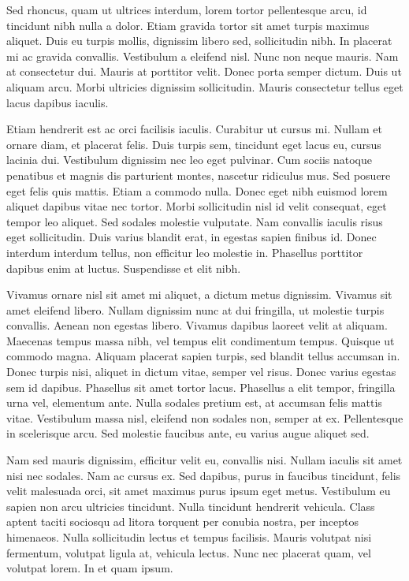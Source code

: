 Sed rhoncus, quam ut ultrices interdum, lorem tortor pellentesque arcu, id tincidunt
nibh nulla a dolor. Etiam gravida tortor sit amet turpis maximus aliquet. Duis eu turpis
mollis, dignissim libero sed, sollicitudin nibh. In placerat mi ac gravida convallis.
Vestibulum a eleifend nisl. Nunc non neque mauris. Nam at consectetur dui. Mauris at
porttitor velit. Donec porta semper dictum. Duis ut aliquam arcu. Morbi ultricies
dignissim sollicitudin. Mauris consectetur tellus eget lacus dapibus iaculis.

Etiam hendrerit est ac orci facilisis iaculis. Curabitur ut cursus mi. Nullam et ornare
diam, et placerat felis. Duis turpis sem, tincidunt eget lacus eu, cursus lacinia dui.
Vestibulum dignissim nec leo eget pulvinar. Cum sociis natoque penatibus et magnis dis
parturient montes, nascetur ridiculus mus. Sed posuere eget felis quis mattis. Etiam a
commodo nulla. Donec eget nibh euismod lorem aliquet dapibus vitae nec tortor. Morbi
sollicitudin nisl id velit consequat, eget tempor leo aliquet. Sed sodales molestie
vulputate. Nam convallis iaculis risus eget sollicitudin. Duis varius blandit erat, in
egestas sapien finibus id. Donec interdum interdum tellus, non efficitur leo molestie
in. Phasellus porttitor dapibus enim at luctus. Suspendisse et elit nibh.

Vivamus ornare nisl sit amet mi aliquet, a dictum metus dignissim. Vivamus sit amet
eleifend libero. Nullam dignissim nunc at dui fringilla, ut molestie turpis convallis.
Aenean non egestas libero. Vivamus dapibus laoreet velit at aliquam. Maecenas tempus
massa nibh, vel tempus elit condimentum tempus. Quisque ut commodo magna. Aliquam
placerat sapien turpis, sed blandit tellus accumsan in. Donec turpis nisi, aliquet in
dictum vitae, semper vel risus. Donec varius egestas sem id dapibus. Phasellus sit amet
tortor lacus. Phasellus a elit tempor, fringilla urna vel, elementum ante. Nulla sodales
pretium est, at accumsan felis mattis vitae. Vestibulum massa nisl, eleifend non sodales
non, semper at ex. Pellentesque in scelerisque arcu. Sed molestie faucibus ante, eu
varius augue aliquet sed.

Nam sed mauris dignissim, efficitur velit eu, convallis nisi. Nullam iaculis sit amet
nisi nec sodales. Nam ac cursus ex. Sed dapibus, purus in faucibus tincidunt, felis
velit malesuada orci, sit amet maximus purus ipsum eget metus. Vestibulum eu sapien non
arcu ultricies tincidunt. Nulla tincidunt hendrerit vehicula. Class aptent taciti
sociosqu ad litora torquent per conubia nostra, per inceptos himenaeos. Nulla
sollicitudin lectus et tempus facilisis. Mauris volutpat nisi fermentum, volutpat ligula
at, vehicula lectus. Nunc nec placerat quam, vel volutpat lorem. In et quam ipsum.


